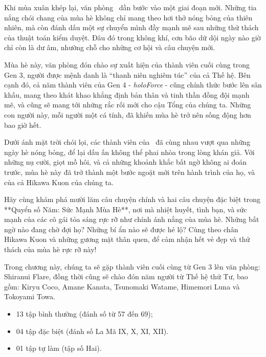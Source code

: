 \documentclass[main.tex]{subfiles}
\begin{document}
Khi mùa xuân khép lại, văn phòng \hll\ dần bước vào một giai đoạn mới. Những tia nắng chói chang của mùa hè không chỉ mang theo hơi thở nóng bỏng của thiên nhiên, mà còn đánh dấu một sự chuyển mình đầy mạnh mẽ sau những thử thách của thuật toán kiểm duyệt. Đâu đó trong không khí, cơn bão dữ dội ngày nào giờ chỉ còn là dư âm, nhường chỗ cho những cơ hội và câu chuyện mới.

Mùa hè này, văn phòng đón chào sự xuất hiện của thành viên cuối cùng trong Gen 3, người được mệnh danh là ``thanh niên nghiêm túc'' của cả Thế hệ. Bên cạnh đó, cả năm thành viên của Gen 4 - \textit{holoForce} - cũng chính thức bước lên sân khấu, mang theo khát khao khẳng định bản thân và tinh thần đồng đội mạnh mẽ, và cũng sẽ mang tới những rắc rối mới cho cậu Tổng của chúng ta. Những con người này, mỗi người một cá tính, đã khiến mùa hè trở nên sống động hơn bao giờ hết.

Dưới ánh mặt trời chói lọi, các thành viên của \hll\ đã cùng nhau vượt qua những ngày hè nóng bỏng, để lại dấu ấn không thể phai nhòa trong lòng khán giả. Với những nụ cười, giọt mồ hôi, và cả những khoảnh khắc bất ngờ không ai đoán trước, mùa hè này đã trở thành một bước ngoặt mới trên hành trình của họ, và của cả Hikawa Kuon của chúng ta.

Hãy cùng khám phá mười lăm câu chuyện chính và hai câu chuyện đặc biệt trong **Quyển số Năm: Sức Mạnh Mùa Hè**, nơi mà nhiệt huyết, tình bạn, và sức mạnh của các cô gái tỏa sáng rực rỡ như chính ánh nắng của mùa hè. Những bất ngờ nào đang chờ đợi họ? Những bí ẩn nào sẽ được hé lộ? Cùng theo chân Hikawa Kuon và những gương mặt thân quen, để cảm nhận hết vẻ đẹp và thử thách của mùa hè rực rỡ này!

Trong chương này, chúng ta sẽ gặp thành viên cuối cùng từ Gen 3 lên văn phòng: Shiranui Flare, đồng thời cũng sẽ chào đón năm người từ Thế hệ thứ Tư, bao gồm: Kiryu Coco, Amane Kanata, Tsunomaki Watame, Himemori Luna và Tokoyami Towa.

{}
\begin{itemize}
    \item 13 tập bình thường (đánh số từ 57 đến 69);
    \item 04 tập đặc biệt (đánh số La Mã IX, X, XI, XII).
    \item 01 tập tự làm (tập số Hai).
\end{itemize}
\end{document}
